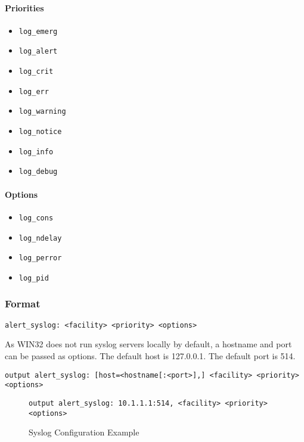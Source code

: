 \documentclass[english]{report}
\newenvironment{note}{
\samepage
    \vspace{10pt}{\textsf{
        {\hspace{7pt}\Huge{$\triangle$\hspace{-12.5pt}{\Large{$^!$}}}}\hspace{5pt}
        {\Large{NOTE}}
    }
    }
   \begin{center}
    \par\vspace{-17pt}

    \begin{lrbox}{\savepar}
    \begin{minipage}[r]{6in}
}
{
    \end{minipage}
    \end{lrbox}
    \fbox{
        \usebox{
            \savepar
	}
    }
    \par\vskip10pt
    \end{center}
}
\newenvironment{note}{
        \begin{rawhtml}
        <p><table border="1"><tr><td><b>
        Note:&nbsp;&nbsp;</b>
        \end{rawhtml}
}{
        \begin{rawhtml}
        </b></td></tr></table></p>
        \end{rawhtml}
}
\begin{document}
\paragraph{Priorities}

\begin{itemize}
\item \texttt{log\_emerg} 
\item \texttt{log\_alert}
\item \texttt{log\_crit}
\item \texttt{log\_err}
\item \texttt{log\_warning} 
\item \texttt{log\_notice}
\item \texttt{log\_info}
\item \texttt{log\_debug}
\end{itemize}

\paragraph{Options}

\begin{itemize}
\item \texttt{log\_cons} 
\item \texttt{log\_ndelay}
\item \texttt{log\_perror}
\item \texttt{log\_pid}
\end{itemize}

\subsubsection{Format}

\begin{verbatim}
alert_syslog: <facility> <priority> <options>
\end{verbatim}


\begin{note}
As WIN32 does not run syslog servers locally by default, a hostname and port
can be passed as options.  The default host is 127.0.0.1.  The default port is
514.
\end{note}

\begin{verbatim}
output alert_syslog: [host=<hostname[:<port>],] <facility> <priority> <options>
\end{verbatim}

\begin{figure}[!hbpt]
\begin{verbatim}
output alert_syslog: 10.1.1.1:514, <facility> <priority> <options>
\end{verbatim}

\caption{Syslog Configuration Example\label{syslog example}}
\end{figure}
\end{document}
